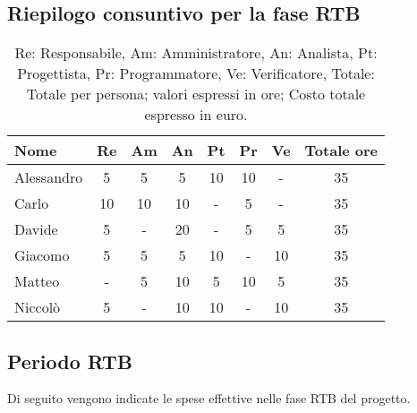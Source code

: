 \subsection{Riepilogo consuntivo per la fase RTB}

\begin{table}[H]
	\centering
	\begin{tabular}{l|c|c|c|c|c|c|c}
		\textbf{Nome}         & \textbf{Re} & \textbf{Am} & \textbf{An} & \textbf{Pt} & \textbf{Pr} & \textbf{Ve} & \textbf{Totale ore} \\
		\hline
		Alessandro            & 5           & 5           & 5           & 10           & 10           & -           & 35              \\
		Carlo                 & 10           & 10           & 10           & -           & 5           & -           & 35              \\
		Davide                & 5           & -           & 20          & -           & 5           & 5           & 35              \\
		Giacomo               & 5           & 5           & 5          & 10           & -           & 10           & 35              \\
		Matteo                & -           & 5           & 10          & 5           & 10           & 5           & 35              \\
		Niccolò               & 5           & -           & 10          & 10           & -           & 10           & 35              \\
		\hline
	\end{tabular}
	\caption{Re: Responsabile, Am: Amministratore, An: Analista, Pt: Progettista,
		Pr: Programmatore, Ve: Verificatore, Totale: Totale per persona; valori espressi in ore; Costo totale espresso in euro.}
\end{table}


\subsection{Periodo RTB}

Di seguito vengono indicate le spese effettive nelle fase RTB del progetto.

